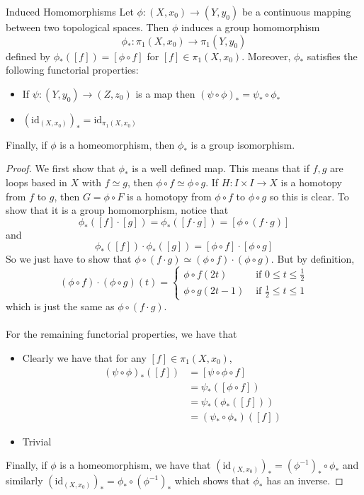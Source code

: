 \documentclass[a4paper]{article}
\begin{document}
\begin{thm}{Induced Homomorphisms}{} Let $\phi:(X,x_0)\to(Y,y_0)$ be a continuous mapping between two topological spaces. Then $\phi$ induces a group homomorphism $$\phi_\ast:\pi_1(X,x_0)\to\pi_1(Y,y_0)$$ defined by $\phi_\ast([f])=[\phi\circ f]$ for $[f]\in\pi_1(X,x_0)$. Moreover, $\phi_\ast$ satisfies the following functorial properties:
\begin{itemize}
\item If $\psi:(Y,y_0)\to(Z,z_0)$ is a map then $(\psi\circ\phi)_\ast=\psi_\ast\circ\phi_\ast$
\item $(\text{id}_{(X,x_0)})_\ast=\text{id}_{\pi_1(X,x_0)}$
\end{itemize}
Finally, if $\phi$ is a homeomorphism, then $\phi_\ast$ is a group isomorphism. \tcbline
\begin{proof}
We first show that $\phi_\ast$ is a well defined map. This means that if $f,g$ are loops based in $X$ with $f\simeq g$, then $\phi\circ f\simeq\phi\circ g$. If $H:I\times I\to X$ is a homotopy from $f$ to $g$, then $G=\phi\circ F$ is a homotopy from $\phi\circ f$ to $\phi\circ g$ so this is clear. To show that it is a group homomorphism, notice that $$\phi_\ast([f]\cdot[g])=\phi_\ast([f\cdot g])=[\phi\circ(f\cdot g)]$$ and $$\phi_\ast([f])\cdot\phi_\ast([g])=[\phi\circ f]\cdot[\phi\circ g]$$ So we just have to show that $\phi\circ (f\cdot g)\simeq (\phi\circ f)\cdot(\phi\circ g)$. But by definition, $$(\phi\circ f)\cdot(\phi\circ g)(t)=\begin{cases}
\phi\circ f(2t) & \text{ if } 0\leq t\leq\frac{1}{2}\\
\phi\circ g(2t-1) & \text{ if } \frac{1}{2}\leq t\leq 1
\end{cases}$$ which is just the same as $\phi\circ(f\cdot g)$. \\~\\

For the remaining functorial properties, we have that 
\begin{itemize}
\item Clearly we have that for any $[f]\in\pi_1(X,x_0)$,
\begin{align*}
(\psi\circ\phi)_\ast([f])&=[\psi\circ\phi\circ f]\\
&=\psi_\ast([\phi\circ f])\\
&=\psi_\ast(\phi_\ast([f]))\\
&=(\psi_\ast\circ\phi_\ast)([f])
\end{align*}
\item Trivial
\end{itemize}
Finally, if $\phi$ is a homeomorphism, we have that $(\text{id}_{(X,x_0)})_\ast=(\phi^{-1})_\ast\circ \phi_\ast$ and similarly $(\text{id}_{(X,x_0)})_\ast=\phi_\ast\circ(\phi^{-1})_\ast$ which shows that $\phi_\ast$ has an inverse. 
\end{proof}
\end{thm}
\end{document}
